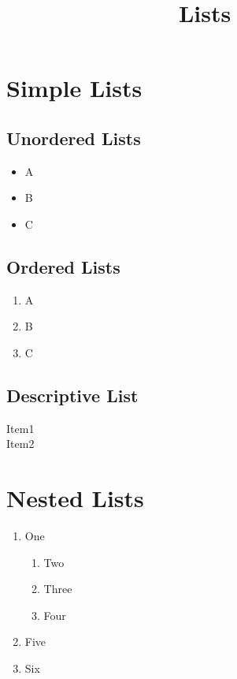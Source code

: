 \documentclass{article}
\title{Lists}
\date{}
\begin{document}
\maketitle
\section{Simple Lists}
\subsection{Unordered Lists}
\begin{itemize}
	\item A
	\item B
	\item C
\end{itemize}

\subsection{Ordered Lists}
\begin{enumerate}
	\item A
	\item B
	\item C
\end{enumerate}

\subsection{Descriptive List}
\begin{description}
	\item [Item1] \blindtext
	\item [Item2] \blindtext
\end{description}


\section{Nested Lists}
\begin{enumerate}
	\item One
	\begin{enumerate}
		\item Two
		\item Three
		\item Four
	\end{enumerate}
	\item Five
	\item Six
\end{enumerate}
\end{document}
